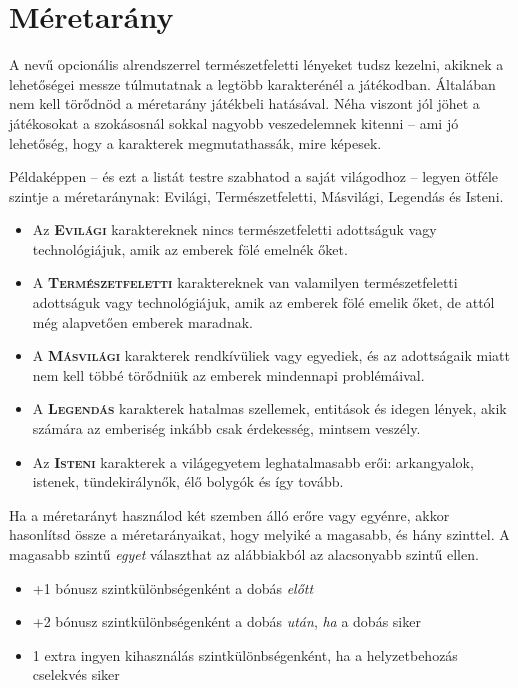 \section{Méretarány}

A  nevű opcionális alrendszerrel természetfeletti lényeket tudsz kezelni, akiknek a lehetőségei messze túlmutatnak a legtöbb karakterénél a játékodban. Általában nem kell törődnöd a méretarány játékbeli hatásával. Néha viszont jól jöhet a játékosokat a szokásosnál sokkal nagyobb veszedelemnek kitenni -- ami jó lehetőség, hogy a karakterek megmutathassák, mire képesek.

Példaképpen -- és ezt a listát testre szabhatod a saját világodhoz -- legyen ötféle szintje a méretaránynak: Evilági, Természetfeletti, Másvilági, Legendás és Isteni.

\begin{itemize}
    \item Az \textsc{\textbf{Evilági}} karaktereknek nincs természetfeletti adottságuk vagy technológiájuk, amik az emberek fölé emelnék őket.
    \item A \textsc{\textbf{Természetfeletti}} karaktereknek van valamilyen természetfeletti adottságuk vagy technológiájuk, amik az emberek fölé emelik őket, de attól még alapvetően emberek maradnak.
    \item A \textsc{\textbf{Másvilági}} karakterek rendkívüliek vagy egyediek, és az adottságaik miatt nem kell többé törődniük az emberek mindennapi problémáival.
    \item A \textsc{\textbf{Legendás}} karakterek hatalmas szellemek, entitások és idegen lények, akik számára az emberiség inkább csak érdekesség, mintsem veszély.
    \item Az \textsc{\textbf{Isteni}} karakterek a világegyetem leghatalmasabb erői: arkangyalok, istenek, tündekirálynők, élő bolygók és így tovább.
\end{itemize}

Ha a méretarányt használod két szemben álló erőre vagy egyénre, akkor hasonlítsd össze a méretarányaikat, hogy melyiké a magasabb, és hány szinttel. A magasabb szintű \emph{egyet} választhat az alábbiakból az alacsonyabb szintű ellen.

\begin{itemize}
    \item +1 bónusz szintkülönbségenként a dobás \emph{előtt}
    \item +2 bónusz szintkülönbségenként a dobás \emph{után}, \emph{ha} a dobás siker
    \item 1 extra ingyen kihasználás szintkülönbségenként, ha a helyzetbehozás cselekvés siker
\end{itemize}

